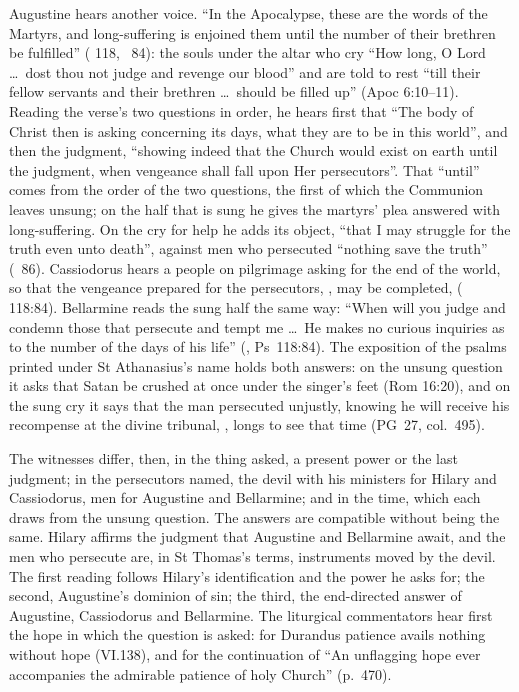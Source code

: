 Augustine hears another voice. ``In the Apocalypse, these are the words of the
Martyrs, and long-suffering is enjoined them until the number of their brethren
be fulfilled'' ( 118, ~84): the souls under the
altar who cry ``How long, O Lord \dots\ dost thou not judge and revenge our blood''
and are told to rest ``till their fellow servants and their brethren \dots\ should
be filled up'' (Apoc 6:10--11). Reading the verse's two questions in order, he
hears first that ``The body of Christ then is asking concerning its days, what
they are to be in this world'', and then the judgment, ``showing indeed that the Church would exist on earth until the
judgment, when vengeance shall fall upon Her persecutors''. That ``until'' comes
from the order of the two questions, the first of which the Communion leaves
unsung; on the half that is sung he gives the martyrs' plea answered with
long-suffering. On the cry for help he adds its object, ``that I may struggle for
the truth even unto death'', against men who persecuted ``nothing save the
truth'' (~86). Cassiodorus hears a people on pilgrimage asking for the
end of the world, so that the vengeance prepared for the persecutors, , may be completed,  (
118:84). Bellarmine reads the sung half the same way: ``When will you judge and
condemn those that persecute and tempt me \dots\ He makes no curious inquiries as to
the number of the days of his life'' (, Ps~118:84).
The exposition of the psalms printed under St Athanasius's name holds both
answers: on the unsung question it asks that Satan be crushed at once under the
singer's feet (Rom 16:20), and on the sung cry it says that the man persecuted
unjustly, knowing he will receive his recompense at the divine tribunal,
, longs to see that time (PG~27, col.~495).

The witnesses differ, then, in the thing asked, a present power or the last
judgment; in the persecutors named, the devil with his ministers for Hilary and
Cassiodorus, men for Augustine and Bellarmine; and in the time, which each draws
from the unsung question. The answers are compatible without being the same.
Hilary affirms the judgment that Augustine and Bellarmine await, and the men who
persecute are, in St Thomas's terms, instruments moved by the devil. The first
reading follows Hilary's identification and the power he asks for; the second,
Augustine's dominion of sin; the third, the end-directed answer of Augustine,
Cassiodorus and Bellarmine. The liturgical commentators hear first the hope in
which the question is asked: for Durandus patience avails nothing without hope
(VI.138), and for the continuation of  ``An unflagging
hope ever accompanies the admirable patience of holy Church'' (p.~470).

